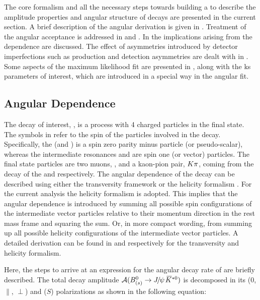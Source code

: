 
The core formalism and all the necessary steps towards building a \pdf to describe the amplitude properties and angular structure of \BJpsiKst decays are presented in
the current section. A brief description of the angular \pdf derivation is given in .
Treatment of the angular acceptance is addressed in  and .
In  the implications arising from the \mkpi dependence are discussed.
The effect of asymmetries introduced by detector imperfections such as production and detection asymmetries are dealt with
in . Some aspects of the maximum likelihood fit are presented in ,
along with the \Acp{k} parameters of interest, which are introduced in a special way in the angular fit.


\subsection{Angular Dependence}
\label{Diferential_Decay_Rate}

The decay of interest, \BsJpsiKst, is a \PtoVV process with 4 charged particles in the final state.
The symbols in \PtoVV refer to the spin of the particles involved in the decay.
Specifically, the \Bs (and \Bd) is a spin zero parity minus particle (or pseudo-scalar), whereas the intermediate resonances
\jpsi and \Kstarzb are spin one (or vector) particles. The final state particles are
two muons, \mmu, and a kaon-pion pair, $K\pi$, coming from the decay of the \jpsi and \Kstarzb respectively.
The angular dependence of the \BsJpsiKst decay can be described using either the transversity framework \cite{transvFrameworkI,transvFrameworkII}
or the helicity formalism \cite{helicityFormI,helicityFormII}. For the current analysis the helicity
formalism is adopted. This implies that the angular dependence is introduced by summing all possible
spin configurations of the intermediate vector particles relative to their momentum direction in the
\Bs rest mass frame and squaring the sum. Or, in more compact wording, from summing up all possible
helicity configurations of the intermediate vector particles. A detailed derivation can be found
in \cite{daanThesis} and \cite{jeroenThesis} respectively for the transversity and helicity formalism.

Here, the steps to arrive at an expression for the angular decay rate of \BsJpsiKst are briefly described.
The total decay amplitude $\mathcal{A}(\text{\BJpsiKst})$ is decomposed in its \pwave ($0$, $\parallel$, $\perp$)
and \swave ($S$) polarizations as shown in the following equation:

